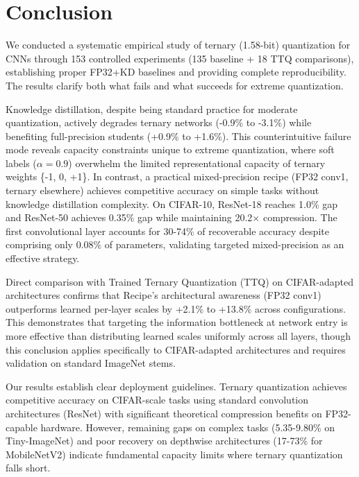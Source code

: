
\section{Conclusion}
\label{sec:conclusion}

We conducted a systematic empirical study of ternary (1.58-bit) quantization for CNNs through 153 controlled experiments (135 baseline + 18 TTQ comparisons), establishing proper FP32+KD baselines and providing complete reproducibility. The results clarify both what fails and what succeeds for extreme quantization.

Knowledge distillation, despite being standard practice for moderate quantization, actively degrades ternary networks (-0.9\% to -3.1\%) while benefiting full-precision students (+0.9\% to +1.6\%). This counterintuitive failure mode reveals capacity constraints unique to extreme quantization, where soft labels ($\alpha=0.9$) overwhelm the limited representational capacity of ternary weights \{-1, 0, +1\}. In contrast, a practical mixed-precision recipe (FP32 conv1, ternary elsewhere) achieves competitive accuracy on simple tasks without knowledge distillation complexity. On CIFAR-10, ResNet-18 reaches 1.0\% gap and ResNet-50 achieves 0.35\% gap while maintaining 20.2× compression. The first convolutional layer accounts for 30-74\% of recoverable accuracy despite comprising only 0.08\% of parameters, validating targeted mixed-precision as an effective strategy.

Direct comparison with Trained Ternary Quantization (TTQ) on CIFAR-adapted architectures confirms that Recipe's architectural awareness (FP32 conv1) outperforms learned per-layer scales by +2.1\% to +13.8\% across configurations. This demonstrates that targeting the information bottleneck at network entry is more effective than distributing learned scales uniformly across all layers, though this conclusion applies specifically to CIFAR-adapted architectures and requires validation on standard ImageNet stems.

Our results establish clear deployment guidelines. Ternary quantization achieves competitive accuracy on CIFAR-scale tasks using standard convolution architectures (ResNet) with significant theoretical compression benefits on FP32-capable hardware. However, remaining gaps on complex tasks (5.35-9.80\% on Tiny-ImageNet) and poor recovery on depthwise architectures (17-73\% for MobileNetV2) indicate fundamental capacity limits where ternary quantization falls short.

